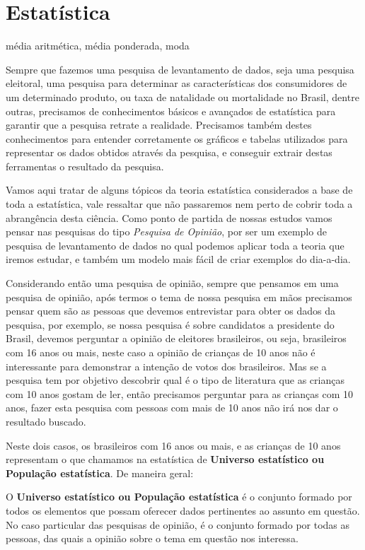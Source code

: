 \chapter{Estatística}

 {\color{red} média aritmética, média ponderada, moda}

Sempre que fazemos uma pesquisa de levantamento de dados, seja uma pesquisa eleitoral, uma pesquisa para determinar as características dos consumidores de um determinado produto, ou taxa de natalidade ou mortalidade no Brasil, dentre outras, precisamos de conhecimentos básicos e avançados de estatística para garantir que a pesquisa retrate a realidade. Precisamos também destes conhecimentos para entender corretamente os gráficos e tabelas utilizados para representar os dados obtidos através da pesquisa, e conseguir extrair destas ferramentas o resultado da pesquisa.

Vamos aqui tratar de alguns tópicos da teoria estatística considerados a base de toda a estatística, vale ressaltar que não passaremos nem perto de cobrir toda a abrangência desta ciência. Como ponto de partida de nossas estudos vamos pensar nas pesquisas do tipo \textit{Pesquisa de Opinião}, por ser um exemplo de pesquisa de levantamento de dados no qual podemos aplicar toda a teoria que iremos estudar, e também um modelo mais fácil de criar exemplos do dia-a-dia.

Considerando então uma pesquisa de opinião, sempre que pensamos em uma pesquisa de opinião, após termos o tema de nossa pesquisa em mãos precisamos pensar quem são as pessoas que devemos entrevistar para obter os dados da pesquisa, por exemplo, se nossa pesquisa é sobre candidatos a presidente do Brasil, devemos perguntar a opinião de eleitores brasileiros, ou seja, brasileiros com 16 anos ou mais, neste caso a opinião de crianças de 10 anos não é interessante para demonstrar a intenção de votos dos brasileiros. Mas se a pesquisa tem por objetivo descobrir qual é o tipo de literatura que as crianças com 10 anos gostam de ler, então precisamos perguntar para as crianças com 10 anos, fazer esta pesquisa com pessoas com mais de 10 anos não irá nos dar o resultado buscado.

Neste dois casos, os brasileiros com 16 anos ou mais, e as crianças de 10 anos representam o que chamamos na estatística de \textbf{Universo estatístico ou População estatística}. De maneira geral:

 \vskip0.3cm
 \colorbox{azul}{
 \begin{minipage}{13cm}
 \begin{center}
  O \textbf{Universo estatístico ou População estatística} é o conjunto formado por todos os elementos que possam oferecer dados pertinentes ao assunto em questão. No caso particular das pesquisas de opinião, é o conjunto formado por todas as pessoas, das quais a opinião sobre o tema em questão nos interessa.
 \end{center}
 \end{minipage}}
 \vskip0.3cm

